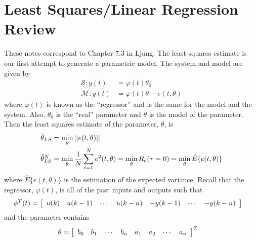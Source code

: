 \mainmatter%
\setcounter{page}{1}

\lectureseries[\course]{\course}

\date{October 20, 2009}

\setaddress%

\setcounter{lecture}{7}
\setcounter{chapter}{7}


\section{Least Squares/Linear Regression Review}
These notes correspond to Chapter 7.3 in Ljung.
The least squares estimate is our first attempt to generate a parametric model.
The system and model are given by
\begin{align*}
\mathcal{S}: y(t) &= \varphi(t)\theta_0 \\
\mathcal{M}: y(t) &= \varphi(t)\theta + e(t,\theta)
\end{align*}
where $\varphi(t)$ is known as the ``regressor'' and is the same for the model and the system.
Also, $\theta_0$ is the ``real'' parameter and $\theta$ is the model of the parameter.
Then the least squares estimate of the parameter, $\theta$, is
\begin{align*}
\hat{\theta}_{LS} &= \min_\theta ||e(t,\theta)|| \\
\hat{\theta}_{LS}^N &= \min_\theta \frac{1}{N}\sum_{t=1}^N e^2(t,\theta) = \min_\theta R_e(\tau=0) = \min_\theta\hat{E}\{e(t,\theta)\}
\end{align*}
where $\hat{E}\{e(t,\theta)\}$ is the estimation of the expected variance.
Recall that the regressor, $\varphi(t)$, is all of the past inputs and outputs such that
\begin{align}
\label{eq:regressor}
\phi^T(t) &= \left[\begin{array}{c c c c c c c}
u(k) & u(k-1) & \cdots & u(k-n) & -y(k-1) & \cdots & -y(k-n) \end{array}\right]
\end{align}
and the parameter contains
\begin{align}
\label{eq:parameter}
\theta &= \left[\begin{array}{c c c c c c c c}
b_0 & b_1 & \cdots & b_n & a_1 & a_2 & \cdots & a_n \end{array}\right]^T
\end{align}
